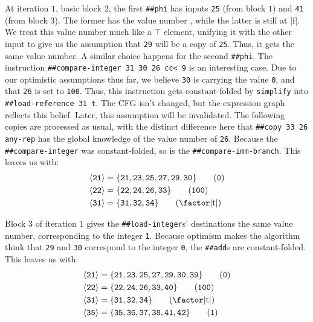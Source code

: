 At iteration $1$, basic block $2$, the first \Verb|##phi| has inputs
\Verb|25| (from block $1$) and \Verb|41| (from block $3$).  The former has
the value number , while the latter is still at \factor|f|.  We treat
this value number much like a $\top$ element, unifying it with the other input
to give us the assumption that \Verb|29| will be a copy of \Verb|25|.
Thus, it gets the same value number.  A similar choice happens for the second
\Verb|##phi|.  The instruction 
%
\Verb|##compare-integer 31 30 26 cc< 9|
%
is an interesting case.  Due to our optimistic assumptions thus far, we believe
\Verb|30| is carrying the value \Verb|0|, and that \Verb|26| is set to
\Verb|100|.  Thus, this instruction gets constant-folded by \Verb|simplify|
into
%
\Verb|##load-reference 31 t|.
%
The \gls{CFG} isn't changed, but the expression graph reflects this belief.
Later, this assumption will be invalidated.  The following copies are processed
as usual, with the distinct difference here that 
%
\Verb|##copy 33 26 any-rep|
%
has the global knowledge of the value number of \Verb|26|.  Because the
\Verb|##compare-integer| was constant-folded, so is the
\Verb|##compare-imm-branch|.  This leaves us with:
%
\begin{align*}
  \vn{21} &= \{\vreg{21},
               \vreg{23},
               \vreg{25},
               \vreg{27},
               \vreg{29},
               \vreg{30}\} \tag{\texttt{0}} \\
  \vn{22} &= \{\vreg{22},
               \vreg{24},
               \vreg{26},
               \vreg{33}\} \tag{\texttt{100}} \\
  \vn{31} &= \{\vreg{31},
               \vreg{32},
               \vreg{34}\} \tag{\text{\factor|t|}}
\end{align*}

Block $3$ of iteration $1$ gives the \Verb|##load-integer|s' destinations the
same value number, corresponding to the integer \Verb|1|.  Because optimism
makes the algorithm think that \Verb|29| and \Verb|30| correspond to the
integer \Verb|0|, the \Verb|##add|s are constant-folded.  This leaves us with:
%
\begin{align*}
  \vn{21} &= \{\vreg{21},
               \vreg{23},
               \vreg{25},
               \vreg{27},
               \vreg{29},
               \vreg{30},
               \vreg{39}\} \tag{\texttt{0}} \\
  \vn{22} &= \{\vreg{22},
               \vreg{24},
               \vreg{26},
               \vreg{33},
               \vreg{40}\} \tag{\texttt{100}} \\
  \vn{31} &= \{\vreg{31},
               \vreg{32},
               \vreg{34}\} \tag{\text{\factor|t|}} \\
  \vn{35} &= \{\vreg{35},
               \vreg{36},
               \vreg{37},
               \vreg{38},
               \vreg{41},
               \vreg{42}\} \tag{\texttt{1}}
\end{align*}

